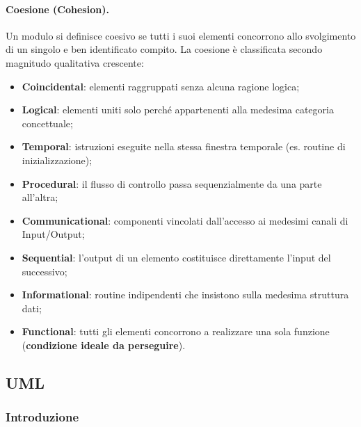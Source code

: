 \documentclass[12pt]{extarticle}
\begin{document}
\paragraph{Coesione (Cohesion).}
Un modulo si definisce coesivo se tutti i suoi elementi concorrono allo svolgimento di un singolo e ben identificato compito. 
La coesione è classificata secondo magnitudo qualitativa crescente: 
\begin{itemize}
    \item \textbf{Coincidental}: elementi raggruppati senza alcuna ragione logica; 
    \item \textbf{Logical}: elementi uniti solo perché appartenenti alla medesima categoria concettuale; 
    \item \textbf{Temporal}: istruzioni eseguite nella stessa finestra temporale (es. routine di inizializzazione); 
    \item \textbf{Procedural}: il flusso di controllo passa sequenzialmente da una parte all'altra; 
    \item \textbf{Communicational}: componenti vincolati dall'accesso ai medesimi canali di Input/Output; 
    \item \textbf{Sequential}: l'output di un elemento costituisce direttamente l'input del successivo; 
    \item \textbf{Informational}: routine indipendenti che insistono sulla medesima struttura dati; 
    \item \textbf{Functional}: tutti gli elementi concorrono a realizzare una sola funzione (\textbf{condizione ideale da perseguire}). 
\end{itemize}

\subsection{UML}

\subsubsection{Introduzione}
\end{document}
